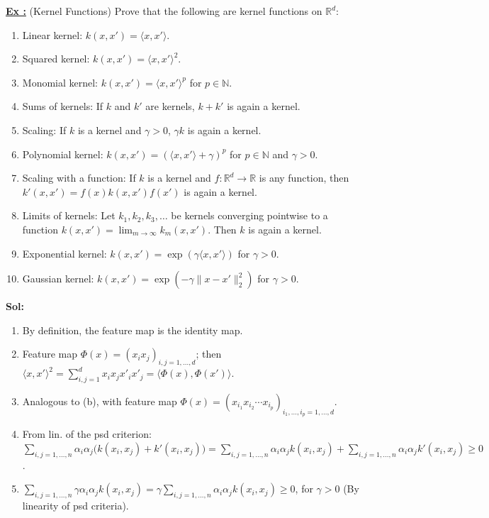 \documentclass[a4paper,10pt]{article}
\newcounter{exerciseCounter}
\newcommand{\exercise}[1]{%
    \vspace{1mm}
    \stepcounter{exerciseCounter}%
    \color{exerciseBlack}
    \textbf{\underline{Ex \theexerciseCounter:}} #1
}
\newcommand{\solution}[1]{%
    {\color{solutionGray} \textbf{Sol: } #1} %
}
\begin{document}
\begin{scriptsize}
\exercise{(Kernel Functions) Prove that the following are kernel functions on \(\mathbb{R}^d\):
\begin{enumerate}[label=(\alph*)]
  \item Linear kernel: \(k(x, x') = \langle x, x' \rangle\).
  \item Squared kernel: \(k(x, x') = \langle x, x' \rangle^2\).
  \item Monomial kernel: \(k(x, x') = \langle x, x' \rangle^p\) for \(p \in \mathbb{N}\).
  \item Sums of kernels: If \(k\) and \(k'\) are kernels, \(k + k'\) is again a kernel.
  \item Scaling: If \(k\) is a kernel and \(\gamma > 0\), \(\gamma k\) is again a kernel.
  \item Polynomial kernel: \(k(x, x') = (\langle x, x' \rangle + \gamma)^p\) for \(p \in \mathbb{N}\) and \(\gamma > 0\).
  \item Scaling with a function: If \(k\) is a kernel and \(f : \mathbb{R}^d \to \mathbb{R}\) is any function, then \(k'(x, x') = f(x)k(x, x')f(x')\) is again a kernel.
  \item Limits of kernels: Let \(k_1, k_2, k_3, \ldots\) be kernels converging pointwise to a function \(k(x, x') = \lim_{m \to \infty} k_m(x, x')\). Then \(k\) is again a kernel.
  \item Exponential kernel: \(k(x, x') = \exp(\gamma \langle x, x' \rangle)\) for \(\gamma > 0\).
  \item Gaussian kernel: \(k(x, x') = \exp(-\gamma \|x - x'\|^2_2)\) for \(\gamma > 0\).
\end{enumerate}}
\solution{\begin{enumerate}[label=(\alph*)]
  \item By definition, the feature map is the identity map.
  \item Feature map \(\Phi(x) = (x_i x_j)_{i,j=1,\ldots,d}\); then \(\langle x, x' \rangle^2 = \sum_{i,j=1}^d x_i x_j x'_i x'_j = \langle \Phi(x), \Phi(x') \rangle\).
  \item Analogous to (b), with feature map \(\Phi(x) = (x_{i_1} x_{i_2} \cdots x_{i_p})_{i_1,\ldots,i_p=1,\ldots,d}\).
  \item From lin. of the psd criterion: \(\sum_{i,j=1,\ldots,n} \alpha_i \alpha_j \big(k(x_i, x_j) + k'(x_i, x_j)\big) = \sum_{i,j=1,\ldots,n} \alpha_i \alpha_j k(x_i, x_j) + \sum_{i,j=1,\ldots,n} \alpha_i \alpha_j k'(x_i, x_j) \geq 0\).
  \item \(\sum_{i,j=1,\ldots,n} \gamma \alpha_i \alpha_j k(x_i, x_j) = \gamma \sum_{i,j=1,\ldots,n} \alpha_i \alpha_j k(x_i, x_j) \geq 0\), for \(\gamma > 0\) (By linearity of psd criteria).

\end{enumerate}}
\end{scriptsize}
\end{document}
